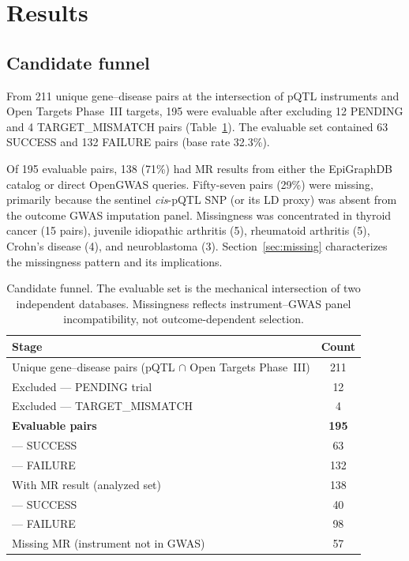\documentclass[11pt]{article}
\begin{document}
\section{Results}

\subsection{Candidate funnel}
\label{sec:funnel}

From 211 unique gene--disease pairs at the intersection of pQTL instruments and Open Targets Phase~III targets, 195 were evaluable after excluding 12 PENDING and 4 TARGET\_MISMATCH pairs (Table~\ref{tab:funnel}). The evaluable set contained 63 SUCCESS and 132 FAILURE pairs (base rate 32.3\%).

Of 195 evaluable pairs, 138 (71\%) had MR results from either the EpiGraphDB catalog or direct OpenGWAS queries. Fifty-seven pairs (29\%) were missing, primarily because the sentinel \emph{cis}-pQTL SNP (or its LD proxy) was absent from the outcome GWAS imputation panel. Missingness was concentrated in thyroid cancer (15 pairs), juvenile idiopathic arthritis (5), rheumatoid arthritis (5), Crohn's disease (4), and neuroblastoma (3). Section~\ref{sec:missing} characterizes the missingness pattern and its implications.

\vspace{1em}
\begin{table}[t]
\centering
\caption{Candidate funnel. The evaluable set is the mechanical intersection of two independent databases. Missingness reflects instrument--GWAS panel incompatibility, not outcome-dependent selection.}
\label{tab:funnel}
\begin{tabular}{lc}
\toprule
Stage & Count \\
\midrule
Unique gene--disease pairs (pQTL $\cap$ Open Targets Phase~III) & 211 \\
Excluded --- PENDING trial & 12 \\
Excluded --- TARGET\_MISMATCH & 4 \\
\textbf{Evaluable pairs} & \textbf{195} \\
\quad --- SUCCESS & 63 \\
\quad --- FAILURE & 132 \\
\midrule
With MR result (analyzed set) & 138 \\
\quad --- SUCCESS & 40 \\
\quad --- FAILURE & 98 \\
Missing MR (instrument not in GWAS) & 57 \\
\bottomrule
\end{tabular}
\end{table}
\end{document}
